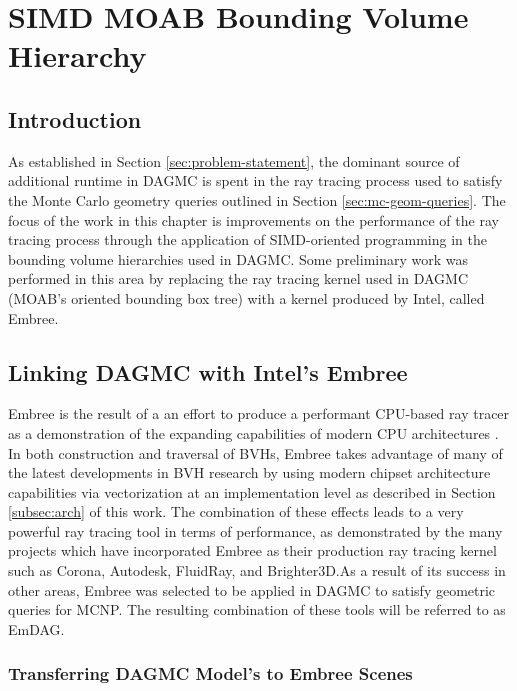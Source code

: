 

\chapter{SIMD MOAB Bounding Volume Hierarchy}\label{ch:simd_bvh}


\section{Introduction}

As established in Section \ref{sec:problem-statement}, the dominant source of
additional runtime in DAGMC is spent in the ray tracing process used to satisfy
the Monte Carlo geometry queries outlined in Section \ref{sec:mc-geom-queries}.
The focus of the work in this chapter is improvements on the performance of the
ray tracing process through the application of SIMD-oriented programming in the
bounding volume hierarchies used in DAGMC. Some preliminary work was performed
in this area by replacing the ray tracing kernel used in DAGMC (MOAB's oriented
bounding box tree) with a kernel produced by Intel, called Embree.

\section{Linking DAGMC with Intel's Embree}\label{sec:embree}

Embree is the result of a an effort to produce a performant CPU-based ray tracer
as a demonstration of the expanding capabilities of modern CPU architectures
\cite{Wald_2014}. In both construction and traversal of BVHs, Embree takes
advantage of many of the latest developments in BVH research by using modern
chipset architecture capabilities via vectorization at an implementation level
as described in Section \ref{subsec:arch} of this work. The combination of these
effects leads to a very powerful ray tracing tool in terms of performance, as
demonstrated by the many projects which have incorporated Embree as their
production ray tracing kernel such as Corona, Autodesk, FluidRay, and
Brighter3D.As a result of its success in other areas, Embree was selected to be
applied in DAGMC to satisfy geometric queries for MCNP. The resulting
combination of these tools will be referred to as EmDAG.

\subsection{Transferring DAGMC Model's to Embree Scenes}%

